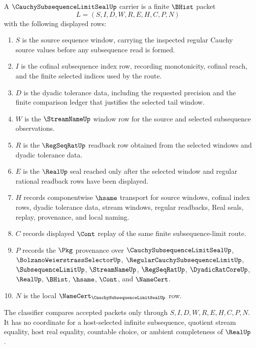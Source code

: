 \begin{definition}
\label{def:cauchy-subsequence-limit-seal-carrier}
A $\CauchySubsequenceLimitSealUp$ carrier is a finite $\BHist$ packet
$$
L=(S,I,D,W,R,E,H,C,P,N)
$$
with the following displayed rows:
\begin{enumerate}
\item $S$ is the source sequence window, carrying the inspected regular Cauchy source values before any subsequence read is formed.
\item $I$ is the cofinal subsequence index row, recording monotonicity, cofinal reach, and the finite selected indices used by the route.
\item $D$ is the dyadic tolerance data, including the requested precision and the finite comparison ledger that justifies the selected tail window.
\item $W$ is the $\StreamNameUp$ window row for the source and selected subsequence observations.
\item $R$ is the $\RegSeqRatUp$ readback row obtained from the selected windows and dyadic tolerance data.
\item $E$ is the $\RealUp$ seal reached only after the selected window and regular rational readback rows have been displayed.
\item $H$ records componentwise $\hsame$ transport for source windows, cofinal index rows, dyadic tolerance data, stream windows, regular readbacks, Real seals, replay, provenance, and local naming.
\item $C$ records displayed $\Cont$ replay of the same finite subsequence-limit route.
\item $P$ records the $\Pkg$ provenance over $\CauchySubsequenceLimitSealUp$, $\BolzanoWeierstrassSelectorUp$, $\RegularCauchySubsequenceLimitUp$, $\SubsequenceLimitUp$, $\StreamNameUp$, $\RegSeqRatUp$, $\DyadicRatCoreUp$, $\RealUp$, $\BHist$, $\hsame$, $\Cont$, and $\NameCert$.
\item $N$ is the local $\NameCert_{\CauchySubsequenceLimitSealUp}$ row.
\end{enumerate}
The classifier compares accepted packets only through $S,I,D,W,R,E,H,C,P,N$. It has no coordinate for a host-selected infinite subsequence, quotient stream equality, host real equality, countable choice, or ambient completeness of $\RealUp$.
\end{definition}

